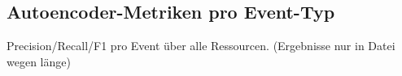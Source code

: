 \documentclass[11pt]{article}
\begin{document}
    \begin{center}
    \end{center}
    { \hspace*{\fill} \\}
    
    \begin{center}
    \end{center}
    { \hspace*{\fill} \\}
    
    \begin{center}
    \end{center}
    { \hspace*{\fill} \\}
    
    \subsection{Autoencoder-Metriken pro
Event-Typ}\label{autoencoder-metriken-pro-event-typ}

Precision/Recall/F1 pro Event über alle Ressourcen. (Ergebnisse nur in
Datei wegen länge)
\end{document}
